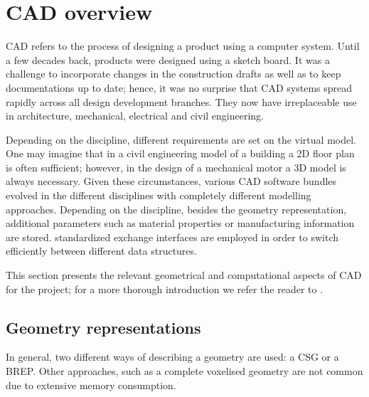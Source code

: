 \section{CAD overview}
\label{sec:CADbackg}
\Acf{CAD} refers to the process of designing a product using a computer system. Until a few decades back, products were designed using a sketch board. It was a challenge to incorporate changes in the construction drafts as well as to keep documentations up to date; hence, it was no surprise that \ac{CAD} systems spread rapidly across all design development branches. They now have irreplaceable use in architecture, mechanical, electrical and civil engineering.

Depending on the discipline, different requirements are set on the virtual model. One may imagine that in a civil engineering model of a building a 2D floor plan is often sufficient; however, in the design of a mechanical motor a 3D model is always necessary. Given these circumstances, various \ac{CAD} software bundles evolved in the different disciplines with completely different modelling approaches. Depending on the discipline, besides the geometry representation, additional parameters such as material properties or manufacturing information are stored. standardized exchange interfaces are employed in order to switch efficiently between different data structures. 

This section presents the relevant geometrical and computational aspects of \ac{CAD} for the project; for a more thorough introduction we refer the reader to \cite{sarcarCAD}.

\subsection{Geometry representations}
In general, two different ways of describing a geometry are used: a \acf{CSG} or a \acf{BREP}. Other approaches, such as a complete voxelised geometry are not common due to extensive memory consumption.
